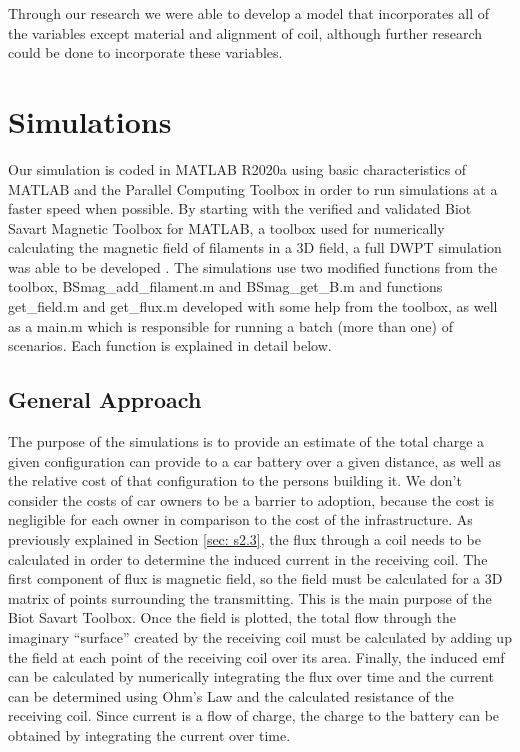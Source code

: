 Through our research we were able to develop a model that incorporates all of the variables except material and 
alignment of coil, although further research could be done to incorporate these variables.

\section{Simulations}
Our simulation is coded in MATLAB R2020a using basic characteristics of MATLAB and the Parallel Computing Toolbox 
in order to run simulations at a faster speed when possible. By starting with the verified and validated Biot 
Savart Magnetic Toolbox for MATLAB, a toolbox used for numerically calculating the magnetic field of filaments 
in a 3D field, a full DWPT simulation was able to be developed \cite{lqueval_lquevalbsmag_2020}. The simulations use two modified 
functions from the toolbox, BSmag\_add\_filament.m and BSmag\_get\_B.m and functions get\_field.m and get\_flux.m 
developed with some help from the toolbox, as well as a main.m which is responsible for running a batch 
(more than one) of scenarios. Each function is explained in detail below.

\subsection{General Approach}
The purpose of the simulations is to provide an estimate of the total charge a given configuration can provide 
to a car battery over a given distance, as well as the relative cost of that configuration to the persons building it.  
We don’t consider the costs of car owners to be a barrier to adoption, because the cost is negligible for each owner 
in comparison to the cost of the infrastructure. As previously explained in Section \ref{sec: s2.3}, the flux through 
a coil needs to be calculated in order to determine the induced current in the receiving coil. The first component 
of flux is magnetic field, so the field must be calculated for a 3D matrix of points surrounding the transmitting. 
This is the main purpose of the Biot Savart Toolbox. Once the field is plotted, the total flow through the imaginary 
“surface” created by the receiving coil must be calculated by adding up the field at each point of the receiving coil 
over its area. Finally, the induced emf can be calculated by numerically integrating the flux over time and the 
current can be determined using Ohm’s Law and the calculated resistance of the receiving coil. Since current is a 
flow of charge, the charge to the battery can be obtained by integrating the current over time.

